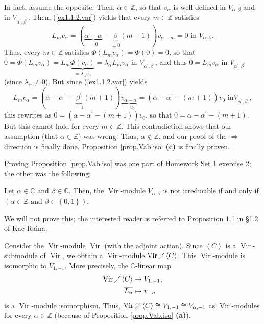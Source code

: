 \documentclass[etingof-lie.tex]{subfiles}
\begin{document}
In fact, assume the opposite. Then, $\alpha\in\mathbb{Z}$, so that $v_{\alpha
}$ is well-defined in $V_{\alpha,\beta}$ and in $V_{\alpha^{\prime}%
,\beta^{\prime}}$. Then, (\ref{ex1.1.2.var}) yields that every $m\in
\mathbb{Z}$ satisfies
\[
L_{m}v_{\alpha}=\left(  \underbrace{\alpha-\alpha}_{=0}-\underbrace{\beta
}_{=0}\left(  m+1\right)  \right)  v_{\alpha-m}=0\text{ in }V_{\alpha,\beta}.
\]
Thus, every $m\in\mathbb{Z}$ satisfies $\Phi\left(  L_{m}v_{\alpha}\right)
=\Phi\left(  0\right)  =0$, so that $0=\Phi\left(  L_{m}v_{\alpha}\right)
=L_{m}\underbrace{\Phi\left(  v_{\alpha}\right)  }_{=\lambda_{\alpha}%
v_{\alpha}}=\lambda_{\alpha}L_{m}v_{\alpha}$ in $V_{\alpha^{\prime}%
,\beta^{\prime}}$, and thus $0=L_{m}v_{\alpha}$ in $V_{\alpha^{\prime}%
,\beta^{\prime}}$ (since $\lambda_{\alpha}\neq0$). But since
(\ref{ex1.1.2.var}) yields%
\[
L_{m}v_{\alpha}=\left(  \alpha-\alpha^{\prime}-\underbrace{\beta^{\prime}%
}_{=1}\left(  m+1\right)  \right)  \underbrace{v_{\alpha-\alpha}}_{=v_{0}%
}=\left(  \alpha-\alpha^{\prime}-\left(  m+1\right)  \right)  v_{0}\text{ in
}V_{\alpha^{\prime},\beta^{\prime}},
\]
this rewrites as $0=\left(  \alpha-\alpha^{\prime}-\left(  m+1\right)
\right)  v_{0}$, so that $0=\alpha-\alpha^{\prime}-\left(  m+1\right)  $. But
this cannot hold for every $m\in\mathbb{Z}$. This contradiction shows that our
assumption (that $\alpha\in\mathbb{Z}$) was wrong. Thus, $\alpha
\notin\mathbb{Z}$, and our proof of the $\Longrightarrow$ direction is finally
done. Proposition \ref{prop.Vab.iso} \textbf{(c)} is finally proven.

Proving Proposition \ref{prop.Vab.iso} was one part of Homework Set 1 exercise
2; the other was the following:

\begin{proposition}
\label{prop.Vab.irr}Let $\alpha\in\mathbb{C}$ and $\beta\in\mathbb{C}$. Then,
the $\operatorname*{Vir}$-module $V_{\alpha,\beta}$ is not irreducible if and
only if $\left(  \alpha\in\mathbb{Z}\text{ and }\beta\in\left\{  0,1\right\}
\right)  $.
\end{proposition}

We will not prove this; the interested reader is referred to Proposition 1.1
in \S 1.2 of Kac-Raina.

\begin{remark}
\label{rmk.Vab.adj}Consider the $\operatorname*{Vir}$-module
$\operatorname*{Vir}$ (with the adjoint action). Since $\left\langle
C\right\rangle $ is a $\operatorname*{Vir}$-submodule of $\operatorname*{Vir}%
$, we obtain a $\operatorname*{Vir}$-module $\operatorname*{Vir}%
\diagup\left\langle C\right\rangle $. This $\operatorname*{Vir}$-module is
isomorphic to $V_{1,-1}$. More precisely, the $\mathbb{C}$-linear map%
\begin{align*}
\operatorname*{Vir}\diagup\left\langle C\right\rangle  &  \rightarrow
V_{1,-1},\\
\overline{L_{n}}  &  \mapsto v_{-n}%
\end{align*}
is a $\operatorname*{Vir}$-module isomorphism. Thus, $\operatorname*{Vir}%
\diagup\left\langle C\right\rangle \cong V_{1,-1}\cong V_{\alpha,-1}$ as
$\operatorname*{Vir}$-modules for every $\alpha\in\mathbb{Z}$ (because of
Proposition \ref{prop.Vab.iso} \textbf{(a)}).
\end{remark}
\end{document}
